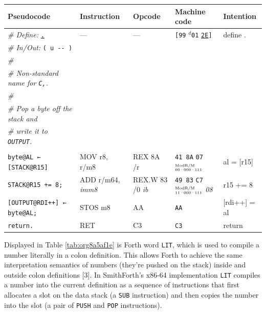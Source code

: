 \documentclass[a4paper,12pt,final]{article}
\makeatletter
\newcommand{\citeprocitem}[2]{\hyper@linkstart{cite}{citeproc_bib_item_#1}#2\hyper@linkend}
\makeatother
\begin{document}
\begin{table}[!htbp] \begin{adjustwidth}{-1cm}{-1cm} \fontsize{10}{12.000000}\selectfont
\begin{center}
\begin{tabular}{l|ll|lH}
\textbf{Pseudocode} & \textbf{Instruction} & \textbf{Opcode} & \textbf{Machine code} & \textbf{Intention}\\[0pt]
\hline
\emph{\# Define:} \uline{\texttt{.}} & --- & --- & \texttt{[99} \(^{d}\)​\texttt{01} \uline{\texttt{2E}}​\texttt{]} & define .\\[0pt]
\emph{\# In/Out:} \texttt{( u -​- )} &  &  &  & \\[0pt]
\emph{\#} &  &  &  & \\[0pt]
\emph{\# Non-standard name for \texttt{C,}.} &  &  &  & \\[0pt]
\emph{\#} &  &  &  & \\[0pt]
\emph{\# Pop a byte off the stack and} &  &  &  & \\[0pt]
\emph{\# write it to \texttt{OUTPUT}.} &  &  &  & \\[0pt]
 &  &  &  & \\[0pt]
\texttt{byte@AL ← [STACK@R15]} & MOV r8, r/m8 & REX 8A /r & \texttt{41 8A} \texttt{07}​\(^{\text{\tiny ModR/M}}_{\text{\tiny 00·000·111}}\) & al = [r15]\\[0pt]
\texttt{STACK@R15 += 8;} & ADD r/m64, \emph{imm8} & REX.W 83 /​0 \emph{ib} & \texttt{49 83} \texttt{C7}​\(^{\text{\tiny ModR/M}}_{\text{\tiny 11·000·111}}\) \emph{08} & r15 += 8\\[0pt]
\texttt{[OUTPUT@RDI++] ← byte@AL;} & STOS m8 & AA & \texttt{AA} & [rdi++] = al\\[0pt]
\texttt{return.} & RET & C3 & \texttt{C3} & return\\[0pt]
\end{tabular}

\end{center}
\normalsize \end{adjustwidth} \end{table} \vspace{0}

Displayed in Table \ref{tab:org8a5af1e} is Forth word \texttt{LIT}, which is used
to compile a number literally in a colon definition.  This allows
Forth to achieve the same interpretation semantics of numbers (they're
pushed on the stack) inside and outside colon definitions
\citeprocitem{3}{[3]}.  In SmithForth's x86-64 implementation
\texttt{LIT} compiles a number into the current definition as a sequence of
instructions that first allocates a slot on the data stack (a \texttt{SUB}
instruction) and then copies the number into the slot (a pair of
\texttt{PUSH} and \texttt{POP} instructions).
\end{document}
